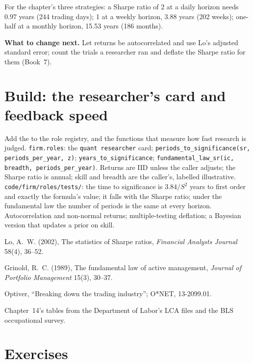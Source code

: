 For the chapter's three strategies: a Sharpe ratio of 2 at a daily horizon needs 0.97 years (244 trading days); 1 at a
weekly horizon, 3.88 years (202 weeks); one-half at a monthly horizon, 15.53 years (186 months).

\textbf{What to change next.} Let returns be autocorrelated and use Lo's adjusted standard error; count the trials a
researcher ran and deflate the Sharpe ratio for them (Book~7).

\section{Build: the researcher's card and feedback speed}\label{bld:in:quant-researcher:roles}

\begin{build}
 Add the  to the role registry, and the functions that measure how fast research is
judged.
 \texttt{firm.roles}: the \texttt{quant researcher} card; \texttt{periods\_to\_significance(sr,
periods\_per\_year, z)}; \texttt{years\_to\_significance}; \texttt{fundamental\_law\_sr(ic, breadth,
periods\_per\_year)}.
 Returns are IID unless the caller adjusts; the Sharpe ratio is annual; skill and breadth are the caller's,
labelled illustrative.
 \texttt{code/firm/roles/tests/}: the time to significance is $3.84/S^2$ years to first order and
exactly the formula's value; it falls with the Sharpe ratio; under the fundamental law the number of periods is the same at
every horizon.
 Autocorrelation and non-normal returns; multiple-testing deflation; a Bayesian version that updates a
prior on skill.
\end{build}

\begin{omsources}
\item Lo, A.~W. (2002), The statistics of Sharpe ratios, \emph{Financial Analysts Journal} 58(4), 36--52.
\item Grinold, R.~C. (1989), The fundamental law of active management, \emph{Journal of Portfolio Management} 15(3), 30--37.
\item Optiver, ``Breaking down the trading industry''; O*NET, 13-2099.01.
\item Chapter~14's tables from the Department of Labor's LCA files and the BLS occupational survey.
\end{omsources}

\section{Exercises}


